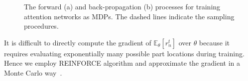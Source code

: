 \documentclass[10pt,twocolumn,letterpaper]{article}
\begin{document}
\begin{figure}[t]
\begin{center}
\hspace{0.05in}
\end{center}
\caption{The forward (a) and back-propagation (b) processes for training attention networks as MDPs.
The dashed lines indicate the sampling procedures.
}
\label{fig:optimization}
\end{figure}

It is difficult to directly compute the gradient of $\mathbb{E}_{\theta}[r^t_n]$ over $\theta$ because it requires evaluating exponentially many possible part locations during training.
Hence we employ REINFORCE algorithm and approximate the gradient in a Monte Carlo way~\cite{sutton1999policy}.
\end{document}
